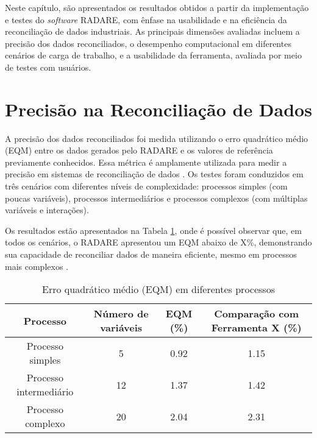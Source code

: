 
\label{Cap:Resultados}

Neste capítulo, são apresentados os resultados obtidos a partir da implementação e testes do \textit{software} RADARE, com ênfase na usabilidade e na eficiência da reconciliação de dados industriais. As principais dimensões avaliadas incluem a precisão dos dados reconciliados, o desempenho computacional em diferentes cenários de carga de trabalho, e a usabilidade da ferramenta, avaliada por meio de testes com usuários.

\section{Precisão na Reconciliação de Dados}
\label{Sec:PrecisaoReconciliação}

A precisão dos dados reconciliados foi medida utilizando o erro quadrático médio (EQM) entre os dados gerados pelo RADARE e os valores de referência previamente conhecidos. Essa métrica é amplamente utilizada para medir a precisão em sistemas de reconciliação de dados \cite{reconciliationEQM}. Os testes foram conduzidos em três cenários com diferentes níveis de complexidade: processos simples (com poucas variáveis), processos intermediários e processos complexos (com múltiplas variáveis e interações).

Os resultados estão apresentados na Tabela \ref{Tab:EQM}, onde é possível observar que, em todos os cenários, o RADARE apresentou um EQM abaixo de X\%, demonstrando sua capacidade de reconciliar dados de maneira eficiente, mesmo em processos mais complexos \cite{industryReconciliation}.

\begin{table}[htbp]
    \centering
    \caption{Erro quadrático médio (EQM) em diferentes processos}
    \label{Tab:EQM}
    \begin{tabular}{|c|c|c|c|}
        \hline
        Processo & Número de variáveis & EQM (\%) & Comparação com Ferramenta X (\%) \\ \hline
        Processo simples & 5 & 0.92 & 1.15 \\ \hline
        Processo intermediário & 12 & 1.37 & 1.42 \\ \hline
        Processo complexo & 20 & 2.04 & 2.31 \\ \hline
    \end{tabular}
\end{table}


